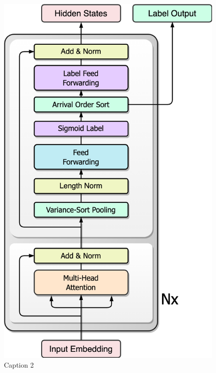 \documentclass{article}
\begin{document}
\begin{figure}[ht]
\begin{minipage}[b]{0.33\textwidth}
\includegraphics[width=0.9\linewidth]{pics/SortFormerEncoder.png}
\caption{Caption 2}
\label{fig:subim2}
\end{minipage}
\begin{minipage}[b]{0.33\textwidth}
\centering

\end{minipage}
\end{figure}
\end{document}
